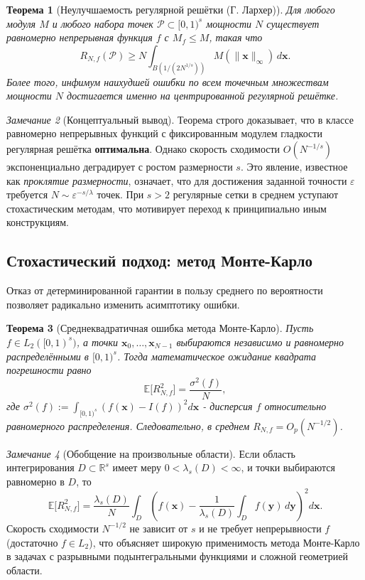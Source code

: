 \documentclass[12pt, a4paper]{article}
\theoremstyle{plain}
\newtheorem{theorem}{Теорема}[section]
\theoremstyle{definition}
\theoremstyle{remark}
\newtheorem{remark}[theorem]{Замечание}
\newcommand{\RR}{\mathbb{R}}
\newcommand{\II}{[0, 1)}
\newcommand{\PP}{\mathcal{P}}
\newcommand{\vx}{\boldsymbol{x}}
\newcommand{\vy}{\boldsymbol{y}}
\begin{document}
\begin{theorem}[Неулучшаемость регулярной решётки (Г. Лархер)]
Для любого модуля $M$ и любого набора точек $\PP \subset \II^s$ мощности $N$ существует равномерно непрерывная функция $f$ с $M_f \le M$, такая что
\[
R_{N,f}(\PP) \ge N \int_{B(1/(2N^{1/s}))} M(\|\vx\|_\infty) \, d\vx.
\]
Более того, инфимум наихудшей ошибки по всем точечным множествам мощности $N$ достигается именно на центрированной регулярной решётке.
\end{theorem}

\begin{remark}[Концептуальный вывод]
Теорема строго доказывает, что в классе равномерно непрерывных функций с фиксированным модулем гладкости регулярная решётка \textbf{оптимальна}. Однако скорость сходимости $O(N^{-1/s})$ экспоненциально деградирует с ростом размерности $s$. Это явление, известное как \textit{проклятие размерности}, означает, что для достижения заданной точности $\varepsilon$ требуется $N \sim \varepsilon^{-s/\lambda}$ точек. При $s > 2$ регулярные сетки в среднем уступают стохастическим методам, что мотивирует переход к принципиально иным конструкциям.
\end{remark}

\subsection{Стохастический подход: метод Монте-Карло}
Отказ от детерминированной гарантии в пользу среднего по вероятности позволяет радикально изменить асимптотику ошибки.

\begin{theorem}[Среднеквадратичная ошибка метода Монте-Карло]
Пусть $f \in L_2(\II^s)$, а точки $\vx_0, \dots, \vx_{N-1}$ выбираются независимо и равномерно распределёнными в $\II^s$. Тогда математическое ожидание квадрата погрешности равно
\[
\mathbb{E}\bigl[R_{N,f}^2\bigr] = \frac{\sigma^2(f)}{N},
\]
где $\sigma^2(f) := \int_{\II^s} \left( f(\vx) - I(f) \right)^2 d\vx$ - дисперсия $f$ относительно равномерного распределения. Следовательно, в среднем $R_{N,f} = O_p(N^{-1/2})$.
\end{theorem}

\begin{remark}[Обобщение на произвольные области]
Если область интегрирования $D \subset \RR^s$ имеет меру $0 < \lambda_s(D) < \infty$, и точки выбираются равномерно в $D$, то
\[
\mathbb{E}\bigl[R_{N,f}^2\bigr] = \frac{\lambda_s(D)}{N} \int_D \left( f(\vx) - \frac{1}{\lambda_s(D)}\int_D f(\vy)\,d\vy \right)^2 d\vx.
\]
Скорость сходимости $N^{-1/2}$ не зависит от $s$ и не требует непрерывности $f$ (достаточно $f \in L_2$), что объясняет широкую применимость метода Монте-Карло в задачах с разрывными подынтегральными функциями и сложной геометрией области.
\end{remark}
\end{document}
